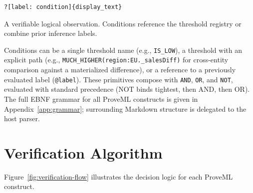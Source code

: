 \documentclass[11pt,a4paper]{article}
\begin{document}
\begin{lstlisting}
?[label: condition]{display_text}
\end{lstlisting}

A verifiable logical observation. Conditions reference the threshold registry or combine prior inference labels.

Conditions can be a single threshold name (e.g., \texttt{IS\_LOW}), a threshold with an explicit path (e.g., \texttt{MUCH\_HIGHER(region:EU.\_salesDiff)} for cross-entity comparison against a materialized difference), or a reference to a previously evaluated label (\texttt{@label}). These primitives compose with \texttt{AND}, \texttt{OR}, and \texttt{NOT}, evaluated with standard precedence (NOT binds tightest, then AND, then OR). The full EBNF grammar for all ProveML constructs is given in Appendix~\ref{app:grammar}; surrounding Markdown structure is delegated to the host parser.

\section{Verification Algorithm}
\label{sec:algorithm}

Figure~\ref{fig:verification-flow} illustrates the decision logic for each ProveML construct.
\end{document}
